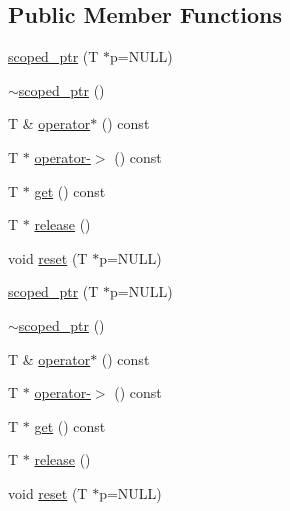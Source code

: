 \subsection*{\-Public \-Member \-Functions}
\begin{DoxyCompactItemize}
\item 
\hyperlink{classtesting_1_1internal_1_1scoped__ptr_a73355cf88cbffc0487070327c3534429}{scoped\-\_\-ptr} (\-T $\ast$p=\-N\-U\-L\-L)
\item 
\hyperlink{classtesting_1_1internal_1_1scoped__ptr_a549881804d773d66e96293a5d4551edb}{$\sim$scoped\-\_\-ptr} ()
\item 
\-T \& \hyperlink{classtesting_1_1internal_1_1scoped__ptr_abcc36ef133f26e7e3145b785df23eb18}{operator$\ast$} () const 
\item 
\-T $\ast$ \hyperlink{classtesting_1_1internal_1_1scoped__ptr_ac0ddd007dfcfef3121f74d0665dfd0cd}{operator-\/$>$} () const 
\item 
\-T $\ast$ \hyperlink{classtesting_1_1internal_1_1scoped__ptr_a07f851191ad3a7c5c1598ef14f710f96}{get} () const 
\item 
\-T $\ast$ \hyperlink{classtesting_1_1internal_1_1scoped__ptr_ab9b564b271e3d80c4adc1d923471f2ae}{release} ()
\item 
void \hyperlink{classtesting_1_1internal_1_1scoped__ptr_a6f757964907a3225b09ce2c9c4e014c8}{reset} (\-T $\ast$p=\-N\-U\-L\-L)
\item 
\hyperlink{classtesting_1_1internal_1_1scoped__ptr_a73355cf88cbffc0487070327c3534429}{scoped\-\_\-ptr} (\-T $\ast$p=\-N\-U\-L\-L)
\item 
\hyperlink{classtesting_1_1internal_1_1scoped__ptr_a549881804d773d66e96293a5d4551edb}{$\sim$scoped\-\_\-ptr} ()
\item 
\-T \& \hyperlink{classtesting_1_1internal_1_1scoped__ptr_abcc36ef133f26e7e3145b785df23eb18}{operator$\ast$} () const 
\item 
\-T $\ast$ \hyperlink{classtesting_1_1internal_1_1scoped__ptr_ac0ddd007dfcfef3121f74d0665dfd0cd}{operator-\/$>$} () const 
\item 
\-T $\ast$ \hyperlink{classtesting_1_1internal_1_1scoped__ptr_a07f851191ad3a7c5c1598ef14f710f96}{get} () const 
\item 
\-T $\ast$ \hyperlink{classtesting_1_1internal_1_1scoped__ptr_ab9b564b271e3d80c4adc1d923471f2ae}{release} ()
\item 
void \hyperlink{classtesting_1_1internal_1_1scoped__ptr_a6f757964907a3225b09ce2c9c4e014c8}{reset} (\-T $\ast$p=\-N\-U\-L\-L)
\end{DoxyCompactItemize}
